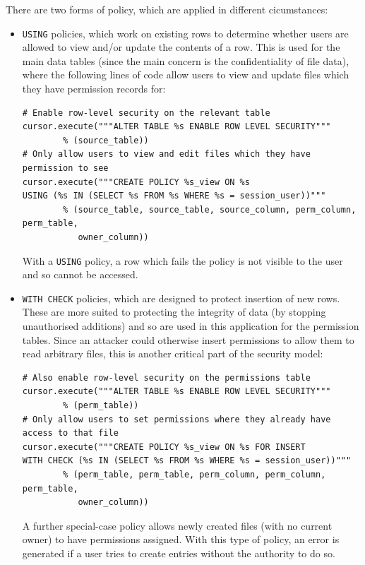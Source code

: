 \documentclass{report}
\begin{document}
There are two forms of policy, which are applied in different cicumstances\cite{postgres-policy}:
\begin{itemize}
\item
  \texttt{USING} policies, which work on existing rows to determine whether users are allowed to view and/or update the contents of a row. This is used for the main data tables (since the main concern is the confidentiality of file data), where the following lines of code allow users to view and update files which they have permission records for:

\begin{verbatim}
# Enable row-level security on the relevant table
cursor.execute("""ALTER TABLE %s ENABLE ROW LEVEL SECURITY"""
        % (source_table))
# Only allow users to view and edit files which they have permission to see
cursor.execute("""CREATE POLICY %s_view ON %s
USING (%s IN (SELECT %s FROM %s WHERE %s = session_user))"""
        % (source_table, source_table, source_column, perm_column, perm_table,
           owner_column))
\end{verbatim}

  With a \texttt{USING} policy, a row which fails the policy is not visible to the user and so cannot be accessed.

\item
  \texttt{WITH CHECK} policies, which are designed to protect insertion of new rows. These are more suited to protecting the integrity of data (by stopping unauthorised additions) and so are used in this application for the permission tables. Since an attacker could otherwise insert permissions to allow them to read arbitrary files, this is another critical part of the security model:

\begin{verbatim}
# Also enable row-level security on the permissions table
cursor.execute("""ALTER TABLE %s ENABLE ROW LEVEL SECURITY"""
        % (perm_table))
# Only allow users to set permissions where they already have access to that file
cursor.execute("""CREATE POLICY %s_view ON %s FOR INSERT
WITH CHECK (%s IN (SELECT %s FROM %s WHERE %s = session_user))"""
        % (perm_table, perm_table, perm_column, perm_column, perm_table,
           owner_column))
\end{verbatim}

  A further special-case policy allows newly created files (with no current owner) to have permissions assigned. With this type of policy, an error is generated if a user tries to create entries without the authority to do so.

\end{itemize}
\end{document}
